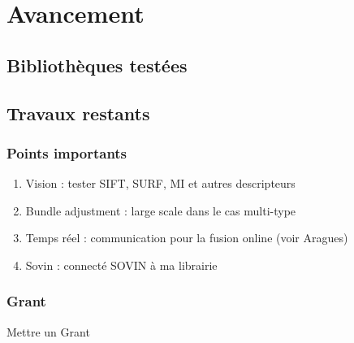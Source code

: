 \section{Avancement}

\subsection{Bibliothèques testées}

\subsection{Travaux restants}

\subsubsection{Points importants}
\begin{enumerate}
\item Vision : tester SIFT, SURF, MI et autres descripteurs
\item Bundle adjustment : large scale dans le cas multi-type
\item Temps réel : communication pour la fusion online (voir Aragues)
\item Sovin : connecté SOVIN à ma librairie
\end{enumerate}

\subsubsection{Grant}

Mettre un Grant